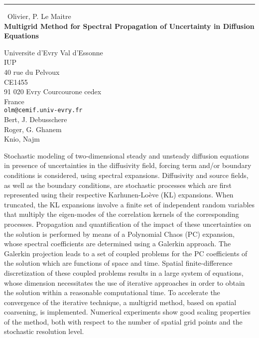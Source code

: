 \documentclass{report}
\begin{document}
\begin{center}
\rule{6in}{1pt} \
{\large Olivier, P. Le Maitre \\
{\bf Multigrid Method for Spectral Propagation of Uncertainty in Diffusion Equations}}

Universite d'Evry Val d'Essonne \\ IUP \\ 40 rue du Pelvoux \\ CE1455 \\ 91 020 Evry Courcourone cedex \\ France
\\
{\tt olm@cemif.univ-evry.fr}\\
Bert, J. Debusschere\\
Roger, G. Ghanem\\
	Knio, Najm\end{center}

Stochastic modeling of two-dimensional steady and unsteady
diffusion equations in presence of uncertainties in the
diffusivity field, forcing term and/or boundary conditions
is considered, using spectral expansions. Diffusivity and
source fields, as well as the boundary conditions, are
stochastic processes which are first represented using
their respective Karhunen-Lo\`eve (KL) expansions. When
truncated, the KL expansions involve a finite set of independent
random variables that multiply the eigen-modes of the
correlation kernels of the corresponding processes.
Propagation and quantification of the impact of these
uncertainties on the solution is performed by means of a
Polynomial Chaos (PC) expansion, whose spectral coefficients are
determined using a Galerkin approach. The Galerkin projection
leads to a set of coupled problems for the PC
coefficients of the solution which are functions of space and
time. Spatial finite-difference discretization of these coupled
problems results in a large system of equations, whose dimension
necessitates the use of iterative approaches in order to obtain
the solution within a reasonable computational time.
To accelerate the convergence of the iterative technique, a
multigrid method, based on spatial coarsening, is implemented.
Numerical experiments show good scaling properties of
the method, both with respect to the number of spatial grid points
and the stochastic resolution level.
\end{document}
